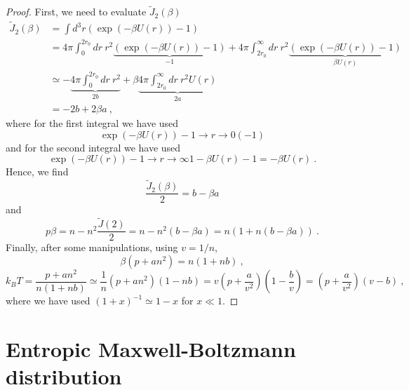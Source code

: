     \begin{proof}
        First, we need to evaluate $\tilde J_2 (\beta)$ 
        \begin{equation*}
        \begin{aligned}
            \tilde J_2 (\beta) & = \int d^3 r (\exp(- \beta U(r)) - 1) \\ & = 4 \pi \int_0^{2r_0} dr ~ r^2 \underbrace{(\exp(- \beta U(r)) - 1)}_{-1} + 4\pi \int_{2r_0}^\infty dr ~ r^2\underbrace{(\exp(- \beta U(r)) - 1)}_{\beta U(r)} \\ & \simeq - \underbrace{4 \pi \int_0^{2r_0} dr ~ r^2}_{2b} + \beta \underbrace{4\pi \int_{2r_0}^\infty dr ~ r^2 U(r)}_{2 a} \\ & = - 2 b + 2 \beta a ~,
        \end{aligned}
        \end{equation*}
        where for the first integral we have used 
        \begin{equation*}
            \exp(-\beta U(r)) - 1 \rightarrow{r \rightarrow 0} (-1) 
        \end{equation*}
        and for the second integral we have used 
        \begin{equation*}
            \exp(-\beta U(r)) - 1 \rightarrow{r \rightarrow \infty} 1 - \beta U(r) - 1 = - \beta U(r) ~.
        \end{equation*}
        Hence, we find
        \begin{equation*}
            \frac{\tilde J_2(\beta)}{2} = b - \beta a 
        \end{equation*}
        and 
        \begin{equation*}
            p \beta = n - n^2 \frac{\tilde J(2)}{2} = n - n^2 (b - \beta a) = n( 1 + n (b - \beta a)) ~.
        \end{equation*}
        Finally, after some manipulations, using $v = 1 / n$,
        \begin{equation*}
            \beta (p + a n^2) = n (1 + n b) ~,
        \end{equation*}
        \begin{equation*}
            k_B T = \frac{p + a n^2}{n (1 + n b)} \simeq \frac{1}{n}(p + a n^2) (1 - n b) = v (p + \frac{a}{v^2}) (1 - \frac{b}{v}) = (p + \frac{a}{v^2}) (v - b) ~,
        \end{equation*}
        where we have used $(1 + x)^{-1} \simeq 1 - x$ for $x \ll 1$.
    \end{proof}

\section{Entropic Maxwell-Boltzmann distribution}


